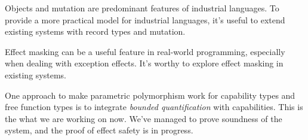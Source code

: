 Objects and mutation are predominant features of industrial
languages. To provide a more practical model for industrial languages,
it's useful to extend existing systems with record types and mutation.

Effect masking can be a useful feature in real-world programming,
especially when dealing with exception effects. It's worthy to explore
effect masking in existing systems.

One approach to make parametric polymorphism work for capability types
and free function types is to integrate \emph{bounded quantification}
with capabilities. This is the what we are working on now. We've
managed to prove soundness of the system, and the proof of effect
safety is in progress.


